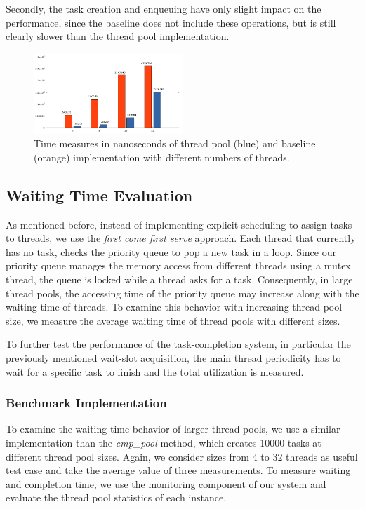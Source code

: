 \documentclass[conference]{IEEEtran}
\begin{document}
Secondly, the task creation and enqueuing have only slight impact on the performance, since the baseline does not include these operations, but is still clearly slower than the thread pool implementation. 

\begin{figure}
	\includegraphics[width=0.5\textwidth]{img/pool_baseline.png}
	\caption{Time measures in nanoseconds of thread pool (blue) and baseline (orange) implementation with different numbers of threads.  }
	\label{fig6}
\end{figure}

\subsection{Waiting Time Evaluation}
As mentioned before, instead of implementing explicit scheduling to assign tasks to threads, we use the \emph{first come first serve} approach. Each thread that currently has no task, checks the priority queue to pop a new task in a loop. Since our priority queue manages the memory access from different threads using a mutex thread, the queue is locked while a thread asks for a task. Consequently, in large thread pools, the accessing time of the priority queue may increase along with the waiting time of threads. To examine this behavior with increasing thread pool size, we measure the average waiting time of thread pools with different sizes.

To further test the performance of the task-completion system, in particular the previously mentioned wait-slot acquisition, the main thread periodicity has to wait for a specific task to finish and the total utilization is measured.

\subsubsection{Benchmark Implementation}
To examine the waiting time behavior of larger thread pools, we use a similar implementation than the \emph{cmp\_pool} method, which creates 10000 tasks at different thread pool sizes. Again, we consider sizes from $4$ to $32$ threads as useful test case and take the average value of three measurements. To measure waiting and completion time, we use the monitoring component of our system and evaluate the thread pool statistics of each instance. 
\end{document}
